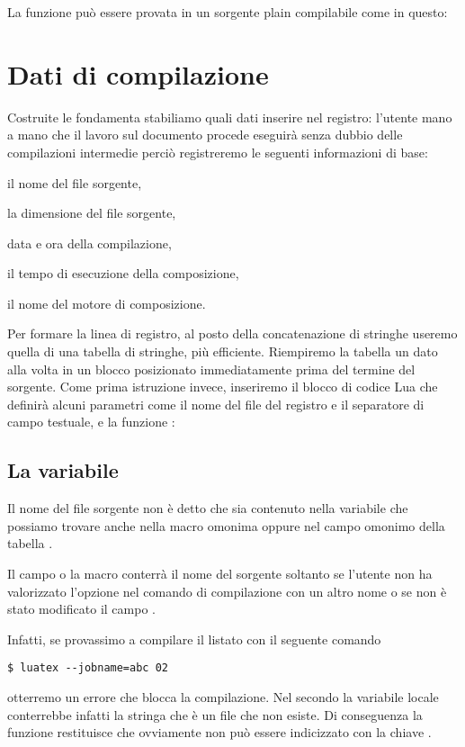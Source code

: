 La funzione  può essere provata in un sorgente plain \LuaTeX{}
compilabile come in questo:


\section{Dati di compilazione}

Costruite le fondamenta stabiliamo quali dati inserire nel registro: l'utente 
mano a mano che il lavoro sul documento procede eseguirà senza dubbio delle
compilazioni intermedie perciò registreremo le seguenti informazioni di base:
\begin{compactenumerate}
\item il nome del file sorgente,
\item la dimensione del file sorgente,
\item data e ora della compilazione,
\item il tempo di esecuzione della composizione,
\item il nome del motore di composizione.
\end{compactenumerate}

Per formare la linea di registro, al posto della concatenazione di stringhe
useremo quella di una tabella di stringhe, più efficiente. Riempiremo la tabella
un dato alla volta in un blocco  posizionato immediatamente prima
del termine del sorgente. Come prima istruzione invece, inseriremo il blocco di
codice Lua che definirà alcuni parametri come il nome del file del registro e il
separatore di campo testuale, e la funzione :


\subsection{La variabile }

Il nome del file sorgente non è detto che sia contenuto nella variabile
 che possiamo trovare anche nella macro omonima oppure nel campo
omonimo della tabella .

Il campo o la macro conterrà il nome del sorgente soltanto se l'utente non ha
valorizzato l'opzione  nel comando di compilazione con un altro
nome o se non è stato modificato il campo .

Infatti, se provassimo a compilare il listato  con il seguente
comando
\begin{Verbatim}[numbers=none,xleftmargin=0pt]
$ luatex --jobname=abc 02
\end{Verbatim}
otterremo un errore che blocca la compilazione. Nel secondo  la
variabile locale  conterrebbe infatti la stringa 
che è un file che non esiste. Di conseguenza la funzione 
restituisce  che ovviamente non può essere indicizzato con la chiave
.

